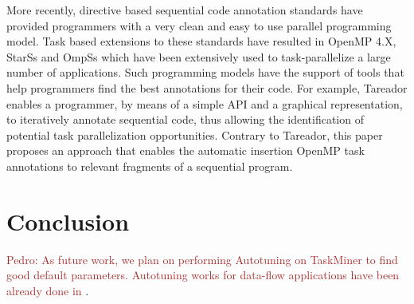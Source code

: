 \documentclass[sigplan,10pt,review,anonymous]{acmart}
\newcommand{\pedro}[1]{\noindent\textcolor{brown}{Pedro: {#1}}}
\newcommand{\pedro}[1]{}
\newcommand\Taskminer{\mbox{\textsf{TaskMiner}}}
\begin{document}
More recently, directive based sequential code annotation  standards have
provided programmers with a very clean and easy to use parallel programming
model. Task based extensions to these standards have resulted in OpenMP 4.X,
StarSs \cite{bellens:sc:2006, perez:iccc:2008, planas:hpca:2009,
tejedor:hpdc:2011} and OmpSs \cite{bueno:icpp:2011, duran:ppl:2011}  which have
been extensively used to task-parallelize a large number of applications. Such
programming models have the support of tools that help programmers find the
best annotations for their code. For example,  Tareador
\cite{ayguade:wcae:2015} enables a programmer, by means of a simple API and a
graphical representation,  to iteratively annotate sequential code, thus
allowing the identification of potential task parallelization opportunities.
Contrary to Tareador,  this paper proposes an approach that enables the
automatic insertion OpenMP task annotations to relevant fragments of a
sequential program.





\section{Conclusion}
\label{sec:conc}

\pedro{As future work, we plan on performing Autotuning on {\Taskminer} to find good default parameters.
Autotuning works for data-flow applications have been already done in \cite{Trancoso17, Emani15}}.


\end{document}
